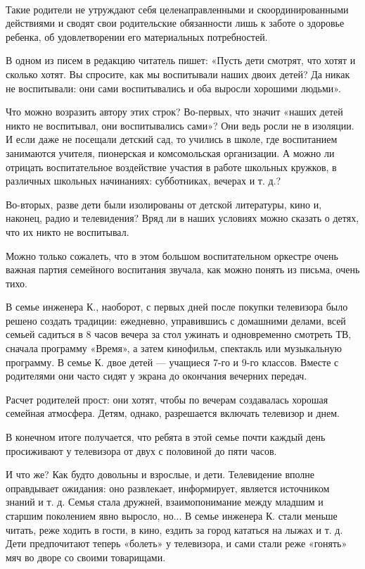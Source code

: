 \documentclass[12pt, a4paper, openany]{book}
\begin{document}
\ \\
Такие родители не утруждают себя целенаправленными и скоординированными действиями и сводят свои родительские обязанности лишь к заботе о здоровье ребенка, об удовлетворении его материальных потребностей. 

В одном из писем в редакцию читатель пишет: «Пусть дети смотрят, что хотят и сколько хотят. Вы спросите, как мы воспитывали наших двоих детей? Да никак не воспитывали: они сами воспитывались и оба выросли хорошими людьми». 

Что можно возразить автору этих строк? Во-первых, что значит «наших детей никто не воспитывал, они воспитывались сами»? Они ведь росли не в изоляции. И если даже не посещали детский сад, то учились в школе, где воспитанием занимаются учителя, пионерская и комсомольская организации. А можно ли отрицать воспитательное воздействие участия в работе школьных кружков, в различных школьных начинаниях: субботниках, вечерах и т. д.? 

Во-вторых, разве дети были изолированы от детской литературы, кино и, наконец, радио и телевидения? Вряд ли в наших условиях можно сказать о детях, что их никто не воспитывал. 

Можно только сожалеть, что в этом большом воспитательном оркестре очень важная партия семейного воспитания звучала, как можно понять из письма, очень тихо. 

В семье инженера К., наоборот, с первых дней после покупки телевизора было решено создать традиции: ежедневно, управившись с домашними делами, всей семьей садиться в 8 часов вечера за стол ужинать и одновременно смотреть ТВ, сначала программу «Время», а затем кинофильм, спектакль или музыкальную программу. В семье К. двое детей — учащиеся 7-го и 9-го классов. Вместе с родителями они часто сидят у экрана до окончания вечерних передач. 

Расчет родителей прост: они хотят, чтобы по вечерам создавалась хорошая семейная атмосфера. Детям, однако, разрешается включать телевизор и днем. 

В конечном итоге получается, что ребята в этой семье почти каждый день просиживают у телевизора от двух с половиной до пяти часов. 

И что же? Как будто довольны и взрослые, и дети. Телевидение вполне оправдывает ожидания: оно развлекает, информирует, является источником знаний и т. д. Семья стала дружней, взаимопонимание между младшим и старшим поколением явно выросло, но... В семье инженера К. стали меньше читать, реже ходить в гости, в кино, ездить за город кататься на лыжах и т. д. Дети предпочитают теперь «болеть» у телевизора, и сами стали реже «гонять» мяч во дворе со своими товарищами. 
\end{document}
